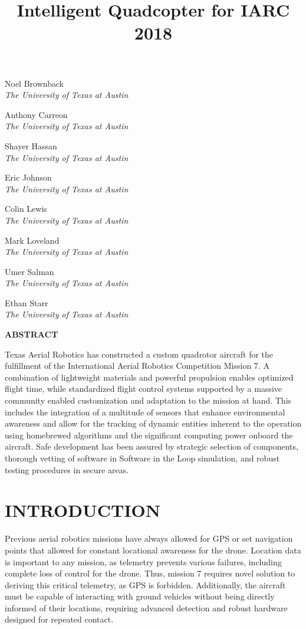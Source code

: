 \documentclass[12pt,letterpaper]{article}
\title{Intelligent Quadcopter for IARC 2018}
\newenvironment{nscenter}
 {\parskip=0pt\par\nopagebreak\centering}
 {\par\noindent\ignorespacesafterend}
\newcommand{\affiliatedauthor}[2]{
\begin{nscenter}
	#1 \\ \textit{#2}
\end{nscenter}
}
\renewcommand{\abstractname}{ABSTRACT}
\renewenvironment{abstract}
 {\vspace{-0.5ex}
	\small
	\begin{center}
		\bfseries \abstractname\vspace{-4ex}\vspace{0pt}
	\end{center}
	\list{}{
		\setlength{\leftmargin}{0.5in}
		\setlength{\rightmargin}{\leftmargin}
	}
	\item\relax}
 {\endlist}
\begin{document}
\begin{center}
	\textbf{\LARGE{\thetitle}}
\end{center}

\affiliatedauthor{Noel Brownback}{The University of Texas at Austin}
\affiliatedauthor{Anthony Carreon}{The University of Texas at Austin}
\affiliatedauthor{Shayer Hassan}{The University of Texas at Austin}
\affiliatedauthor{Eric Johnson}{The University of Texas at Austin}
\affiliatedauthor{Colin Lewis}{The University of Texas at Austin}
\affiliatedauthor{Mark Loveland}{The University of Texas at Austin}
\affiliatedauthor{Umer Salman}{The University of Texas at Austin}
\affiliatedauthor{Ethan Starr}{The University of Texas at Austin}


\begin{abstract}
Texas Aerial Robotics has constructed a custom quadrotor aircraft for the fulfillment of the International Aerial Robotics Competition Mission 7. A combination of lightweight materials and powerful propulsion enables optimized flight time, while standardized flight control systems supported by a massive community enabled customization and adaptation to the mission at hand. This includes the integration of a multitude of sensors that enhance environmental awareness and allow for the tracking of dynamic entities inherent to the operation using homebrewed algorithms and the significant computing power onboard the aircraft. Safe development has been assured by strategic selection of components, thorough vetting of software in Software in the Loop simulation, and robust testing procedures in secure areas.
\end{abstract}


\section*{INTRODUCTION}
	Previous aerial robotics missions have always allowed for GPS or set navigation points that allowed for constant locational awareness for the drone. Location data is important to any mission, as telemetry prevents various failures, including complete loss of control for the drone. Thus, mission 7 requires novel solution to deriving this critical telemetry, as GPS is forbidden. Additionally, the aircraft must be capable of interacting with ground vehicles without being directly informed of their locations, requiring advanced detection and robust hardware designed for repeated contact.
\end{document}
